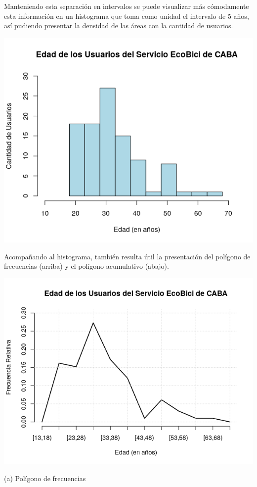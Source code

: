 \documentclass[11pt]{article}
\begin{document}
    Manteniendo esta separaci\'on en intervalos se puede visualizar m\'as c\'omodamente esta informaci\'on en un histograma
    que toma como unidad el intervalo de 5 a\~{n}os, as\'i pudiendo presentar la densidad de las \'areas con
    la cantidad de usuarios.

    \hspace{7mm}\includegraphics[scale=0.7]{HistEdad.png}

    Acompañando al histograma, tambi\'en resulta \'util la presentaci\'on del pol\'igono de frecuencias (arriba) y el pol\'igono acumulativo (abajo).

    \begin{center}
    \includegraphics[scale=0.55]{PoligFrecEdad.png}
    \vspace{-4mm}

    (a) Pol\'igono de frecuencias
    \end{center}
\end{document}
